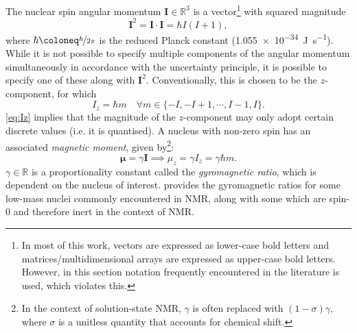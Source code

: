 The nuclear spin angular momentum $\symbf{I} \in \mathbb{R}^3$ is a
vector\footnote{
    In most of this work, vectors are expressed as lower-case
    bold letters and matrices/multidimensional arrays are expressed as
    upper-case bold letters. However, in this section notation
    frequently encountered in the literature is used, which violates this.
} with squared magnitude
\begin{equation}
  \symbf{I}^2 = \symbf{I} \cdot \symbf{I} = \hbar I (I + 1),
  \label{eq:I-squared}
\end{equation}
where $\hbar \coloneq \nicefrac{h}{2 \pi}$ is the reduced Planck constant
(\qty{1.055e-34}{\joule\per\second}). While it
is not possible to specify multiple components of the angular momentum
simultaneously in accordance with the uncertainty principle, it is possible to
specify one of these along with $\symbf{I}^2$. Conventionally, this is chosen
to be the $z$-component, for which
\begin{equation}
  I_z = \hbar m \quad \forall
    m \in \lbrace -I, -I+1, \cdots, I - 1, I \rbrace.
  \label{eq:Iz}
\end{equation}
\cref{eq:Iz}
implies that the magnitude of the $z$-component may only adopt certain discrete
values (i.e. it is quantised). A nucleus with non-zero spin has an associated
\textit{magnetic moment}, given by\footnote{
    In the context of solution-state \ac{NMR}, $\gamma$ is often replaced with
    $(1-\sigma)\gamma$, where $\sigma$ is a unitless quantity that accounts for
    chemical shift.
}:
\begin{equation}
  \symbf{\mu} = \gamma \symbf{I} \implies \mu_z = \gamma I_z = \gamma \hbar m.
\end{equation}
$\gamma \in \mathbb{R}$ is a proportionality constant called the
\textit{gyromagnetic ratio}, which is dependent on the nucleus of interest.
 provides the gyromagnetic ratios for some low-mass
nuclei commonly encountered in NMR, along with some which are spin-$0$ and
therefore inert in the context of \ac{NMR}.

